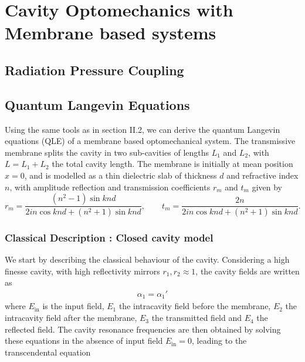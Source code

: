 \section{Cavity Optomechanics with Membrane based systems }
\subsection{Radiation Pressure Coupling}
\subsection{Quantum Langevin Equations}

Using the same tools as in section II.2, we can derive the quantum Langevin equations (QLE) of a membrane based optomechanical system. The transmissive membrane splits the cavity in two sub-cavities of lengths \(L_1\) and \(L_2\), with \(L=L_1+L_2\) the total cavity length. The membrane is initially at mean position $x=0$, and is modelled as a thin dielectric slab of thickness \(d\) and refractive index \(n\), with amplitude reflection and transmission coefficients \(r_m\) and \(t_m\) given by \cite{thompson_strong_2008}
\begin{equation}
r_m = \frac{(n^2-1)\sin k n d}{2 i n \cos k n d  + (n^2+1)\sin k n d}, \qquad t_m = \frac{2 n}{2 i n \cos k n d  + (n^2+1)\sin k n d}. 
\end{equation}

\subsubsection{Classical Description : Closed cavity model}
We start by describing the classical behaviour of the cavity. Considering a high finesse cavity, with high reflectivity mirrors \(r_1, r_2 \approx 1\), the cavity fields are written as 
\begin{equation}
\begin{aligned}
\alpha_1 = \alpha_1'
\end{aligned}
\end{equation}
where \(E_{\mathrm{in}}\) is the input field, \(E_1\) the intracavity field before the membrane, \(E_2\) the intracavity field after the membrane, \(E_3\) the transmitted field and \(E_4\) the reflected field. The cavity resonance frequencies are then obtained by solving these equations in the absence of input field \(E_{\mathrm{in}}=0\), leading to the transcendental equation \cite{jayich_dispersive_2008}



